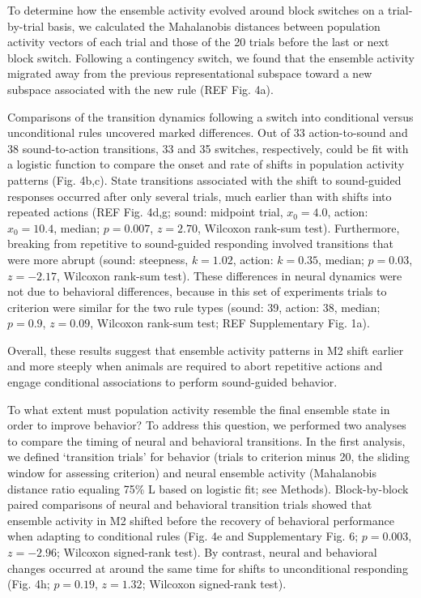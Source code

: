 To determine how the ensemble activity evolved around block switches on a trial-by-trial basis, we calculated the Mahalanobis distances between population activity vectors of each trial and those of the 20 trials before the last or next block switch. Following a contingency switch, we found that the ensemble activity migrated away from the previous representational subspace toward a new subspace associated with the new rule (REF Fig. 4a). 


Comparisons of the transition dynamics following a switch into conditional versus unconditional rules uncovered marked differences. Out of 33 action-to-sound and 38 sound-to-action transitions, 33 and 35 switches, respectively, could be fit with a logistic function to compare the onset and rate of shifts in population activity patterns (Fig. 4b,c). State transitions associated with the shift to sound-guided responses occurred after only several trials, much earlier than with shifts into repeated actions (REF Fig. 4d,g; sound: midpoint trial, $x_0 = 4.0$, action: $x_0 = 10.4$, median; $p = 0.007$, $z = 2.70$, Wilcoxon rank-sum test). Furthermore, breaking from repetitive to sound-guided responding involved transitions that were more abrupt (sound: steepness, $k = 1.02$, action: $k = 0.35$, median; $p = 0.03$, $z = -2.17$, Wilcoxon rank-sum test). These differences in neural dynamics were not due to behavioral differences, because in this set of experiments trials to criterion were similar for the two rule types (sound: 39, action: 38, median; $p = 0.9$, $z = 0.09$, Wilcoxon rank-sum test; REF Supplementary Fig. 1a). 

Overall, these results suggest that ensemble activity patterns in M2 shift earlier and more steeply when animals are required to abort repetitive actions and engage conditional associations to perform sound-guided behavior.

To what extent must population activity resemble the final ensemble state in order to improve behavior? To address this question, we performed two analyses to compare the timing of neural and behavioral transitions. In the first analysis, we defined `transition trials' for behavior (trials to criterion minus 20, the sliding window for assessing criterion) and neural ensemble activity (Mahalanobis distance ratio equaling 75\% L based on logistic fit; see Methods). Block-by-block paired comparisons of neural and behavioral transition trials showed that ensemble activity in M2 shifted before the recovery of behavioral performance when adapting to conditional rules (Fig. 4e and Supplementary Fig. 6; $p = 0.003$, $z = -2.96$; Wilcoxon signed-rank test). By contrast, neural and behavioral changes occurred at around the same time for shifts to unconditional responding (Fig. 4h; $p = 0.19$, $z = 1.32$; Wilcoxon signed-rank test). 

